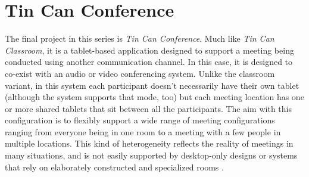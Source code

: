 \documentclass{tufte-handout}
\begin{document}
% 


\section{Tin Can Conference}

The final project in this series is \emph{Tin Can Conference}. Much like \emph{Tin Can Classroom}, it is a tablet-based application designed to support a meeting being conducted using another communication channel. In this case, it is designed to co-exist with an audio or video conferencing system. Unlike the classroom variant, in this system each participant doesn't necessarily have their own tablet (although the system supports that mode, too) but each meeting location has one or more shared tablets that sit between all the participants. The aim with this configuration is to flexibly support a wide range of meeting configurations ranging from everyone being in one room to a meeting with a few people in multiple locations. This kind of heterogeneity reflects the reality of meetings in many situations, and is not easily supported by desktop-only designs \citet{find_something_for_this} or systems that rely on elaborately constructed and specialized rooms \citet{telepresence_rooms_and_some_research_systems}.
\end{document}
